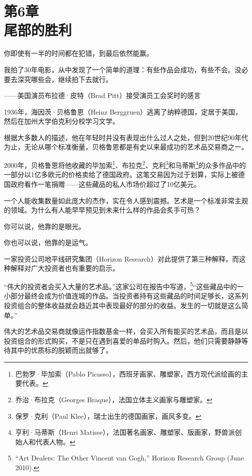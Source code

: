 
\section[第6章\q 尾部的胜利]{第6章\\ 尾部的胜利}

{\kaishu

你即使有一半的时间都在犯错，到最后依然能赢。

我拍了30年电影，从中发现了一个简单的道理：有些作品会成功，有些不会。没必要去深究哪些会，继续拍下去就行。

\hfill ——美国演员布拉德·皮特（Brad Pitt）接受演员工会奖时的感言

}

1936年，海因茨·贝格鲁恩（Heinz Berggruen）逃离了纳粹德国，定居于美国，然后在加州大学伯克利分校学习文学。

根据大多数人的描述，他在年轻时并没有表现出什么过人之处，但到20世纪90年代为止，无论从哪个标准衡量，贝格鲁恩都是有史以来最成功的艺术品交易商之一。

2000年，贝格鲁恩将他收藏的毕加索\footnote{巴勃罗·毕加索（Pablo Picasso），西班牙画家、雕塑家，西方现代派绘画的主要代表。}、布拉克\footnote{乔治·布拉克（Georges Braque），法国立体主义画家与雕塑家。}、克利\footnote{保罗·克利（Paul Klee），瑞士出生的德国画家，画风多变。}和马蒂斯\footnote{亨利·马蒂斯（Henri Matisse），法国著名画家、雕塑家、版画家，野兽派创始人和代表人物。}的众多作品中的一部分以1亿多欧元的价格卖给了德国政府。这笔交易因为过于划算，实际上被德国政府看作一笔捐赠——这些藏品的私人市场价超过了10亿美元。

一个人能收集数量如此庞大的杰作，实在令人感到震撼。艺术是一个标准非常主观的领域。为什么有人能早早预见到未来什么样的作品会炙手可热？

你可以说，他靠的是眼光。

你也可以说，他靠的是运气。

一家投资公司地平线研究集团（Horizon Research）对此提供了第三种解释，而这种解释对广大投资者也有重要的启示。

“伟大的投资者会买入大量的艺术品。”这家公司在报告中写道，\footnote{“Art Dealers: The Other Vincent van Gogh,” Horizon Research Group (June 2010).}“这些藏品中的一小部分最终会成为价值连城的作品。当投资者持有这些藏品的时间足够长，这系列投资组合的整体收益就会趋近其中表现最好的部分的收益。发生的一切就是这么简单。”

伟大的艺术品交易商就像运作指数基金一样，会买入所有能买的艺术品，而且是以投资组合的形式购买，不是只在遇到喜爱的单品时购入。然后，他们只需要静静等待其中的优质标的脱颖而出就够了。


